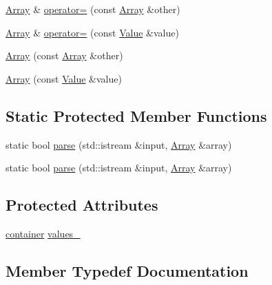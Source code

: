 \begin{DoxyCompactItemize}
\item 
\hyperlink{classjsonxx_1_1_array}{Array} \& \hyperlink{classjsonxx_1_1_array_a2f11a223fe49214c3b2a8f84469c7b29}{operator=} (const \hyperlink{classjsonxx_1_1_array}{Array} \&other)
\item 
\hyperlink{classjsonxx_1_1_array}{Array} \& \hyperlink{classjsonxx_1_1_array_a1f6ef1bfd2df5dd143cdd38baa88fd87}{operator=} (const \hyperlink{classjsonxx_1_1_value}{Value} \&value)
\item 
\hyperlink{classjsonxx_1_1_array_ac056f93d51ff935f5a20d4edfb1c8bb0}{Array} (const \hyperlink{classjsonxx_1_1_array}{Array} \&other)
\item 
\hyperlink{classjsonxx_1_1_array_a3888dd7125eeab6daf89dcf5c61cafa7}{Array} (const \hyperlink{classjsonxx_1_1_value}{Value} \&value)
\end{DoxyCompactItemize}
\subsection*{Static Protected Member Functions}
\begin{DoxyCompactItemize}
\item 
static bool \hyperlink{classjsonxx_1_1_array_ae335113a468951a0bf94e471c0705225}{parse} (std\+::istream \&input, \hyperlink{classjsonxx_1_1_array}{Array} \&array)
\item 
static bool \hyperlink{classjsonxx_1_1_array_ac70c195ad0b937565151fa1f44f635b7}{parse} (std\+::istream \&input, \hyperlink{classjsonxx_1_1_array}{Array} \&array)
\end{DoxyCompactItemize}
\subsection*{Protected Attributes}
\begin{DoxyCompactItemize}
\item 
\hyperlink{classjsonxx_1_1_array_a1bc01c9ef6a589c435c1b721d9922255}{container} \hyperlink{classjsonxx_1_1_array_aa6da6cdf631333feee9062fa76af54b4}{values\+\_\+}
\end{DoxyCompactItemize}


\subsection{Member Typedef Documentation}
\hypertarget{classjsonxx_1_1_array_a1bc01c9ef6a589c435c1b721d9922255}{}

